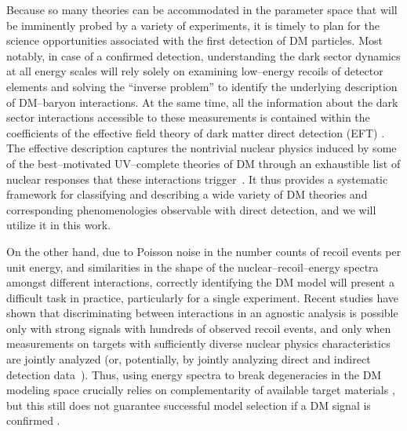 \documentclass[11pt, a4paper]{article}
\begin{document}
Because so many theories can be accommodated in the parameter space that will be imminently probed by a variety of experiments, it is timely to plan for the science opportunities associated with the first detection of DM particles. Most notably, in case of a confirmed detection, understanding the dark sector dynamics at all energy scales will rely solely on examining low--energy recoils of detector elements and solving the ``inverse problem'' to identify the underlying description of DM--baryon interactions. At the same time, all the information about the dark sector interactions accessible to these measurements is contained within the coefficients of the effective field theory of dark matter direct detection (EFT) \cite{Fitzpatrick:2012ix,Fitzpatrick:2012ib,Anand:2013yka,Bishara:2016hek}. The effective description captures the nontrivial nuclear physics induced by some of the best--motivated UV--complete theories of DM \cite{Gresham:2014vja, Gluscevic:2015sqa,DEramo:2014nmf} through an exhaustible list of nuclear responses that these interactions trigger~\cite{Fitzpatrick:2012ix,Fitzpatrick:2012ib,Anand:2013yka}. It thus provides a systematic framework for classifying and describing a wide variety of DM theories and corresponding phenomenologies observable with direct detection, and we will utilize it in this work. 
 
On the other hand, due to Poisson noise in the number counts of recoil events per unit energy, and similarities in the shape of the nuclear--recoil--energy spectra amongst different interactions, correctly identifying the DM model will present a difficult task in practice, particularly for a single experiment. Recent studies have shown that discriminating between interactions in an agnostic analysis is possible only with strong signals with hundreds of observed recoil events, and only when measurements on targets with sufficiently diverse nuclear physics characteristics are jointly analyzed \cite{Gluscevic:2014vga,Gluscevic:2015sqa} (or, potentially, by jointly analyzing direct and indirect detection data~\cite{Roszkowski:2016bhs}). Thus, using energy spectra to break degeneracies in the DM modeling space crucially relies on complementarity of available target materials \cite{McDermott:2011hx,Peter:2013aha,Gluscevic:2014vga,Catena:2014epa,Catena:2014hla,Dent:2015zpa,Gluscevic:2015sqa,Ruppin:2014bra,Queiroz:2016sxf}, but this still does not guarantee successful model selection if a DM signal is confirmed \cite{Gluscevic:2014vga,Gluscevic:2015sqa,Queiroz:2016sxf}. %
\end{document}
